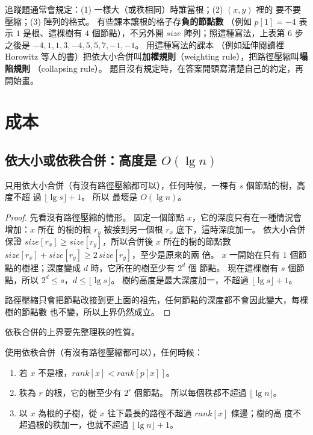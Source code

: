 \begin{examnote}
追蹤題通常會規定：(1) 一樣大（或秩相同）時誰當根；(2) $(x, y)$ 裡的
 要不要壓縮；(3) 陣列的格式。 有些課本讓根的格子存\textbf{負的節點數}
（例如 $p[1] = -4$ 表示 $1$ 是根、這棵樹有 $4$ 個節點），不另外開 $\mathit{size}$
陣列；照這種寫法，上表第 6 步之後是 $-4, 1, 1, 3, -4, 5, 5, 7, -1, -1$。 用這種寫法的課本
（例如延伸閱讀裡 Horowitz 等人的書）把依大小合併叫\textbf{加權規則}（weighting rule），把路徑壓縮叫\textbf{塌陷規則}
（collapsing rule）。 題目沒有規定時，在答案開頭寫清楚自己的約定，再開始畫。
\end{examnote}

\section{成本}
\label{sec:ds-cost}

\subsection{依大小或依秩合併：高度是 $O(\lg n)$}

\begin{theorem}
\label{thm:ds-size-height}
只用依大小合併（有沒有路徑壓縮都可以），任何時候，一棵有 $s$ 個節點的樹，高度不超
過 $\lfloor \lg s \rfloor + 1$。 所以  最壞是 $O(\lg n)$。
\end{theorem}

\begin{proof}
先看沒有路徑壓縮的情形。 固定一個節點 $x$，它的深度只有在一種情況會增加：$x$ 所在
的樹的根 $r_y$ 被接到另一個根 $r_x$ 底下，這時深度加一。 依大小合併保證
$\mathit{size}[r_x] \ge \mathit{size}[r_y]$，所以合併後 $x$ 所在的樹的節點數
$\mathit{size}[r_x] + \mathit{size}[r_y] \ge 2\,\mathit{size}[r_y]$，至少是原來的兩
倍。 $x$ 一開始在只有 $1$ 個節點的樹裡；深度變成 $d$ 時，它所在的樹至少有 $2^d$ 個
節點。 現在這棵樹有 $s$ 個節點，所以 $2^d \le s$，$d \le \lfloor \lg s \rfloor$。
樹的高度是最大深度加一，不超過 $\lfloor \lg s \rfloor + 1$。

路徑壓縮只會把節點改接到更上面的祖先，任何節點的深度都不會因此變大，每棵樹的節點數
也不變，所以上界仍然成立。
\end{proof}

依秩合併的上界要先整理秩的性質。

\begin{lemma}
\label{lem:ds-rank}
使用依秩合併（有沒有路徑壓縮都可以），任何時候：
\begin{enumerate}
\item 若 $x$ 不是根，$\mathit{rank}[x] < \mathit{rank}[p[x]]$。
\item 秩為 $r$ 的根，它的樹至少有 $2^r$ 個節點。 所以每個秩都不超過
$\lfloor \lg n \rfloor$。
\item 以 $x$ 為根的子樹，從 $x$ 往下最長的路徑不超過 $\mathit{rank}[x]$ 條邊；樹的高
度不超過根的秩加一，也就不超過 $\lfloor \lg n \rfloor + 1$。
\end{enumerate}
\end{lemma}


